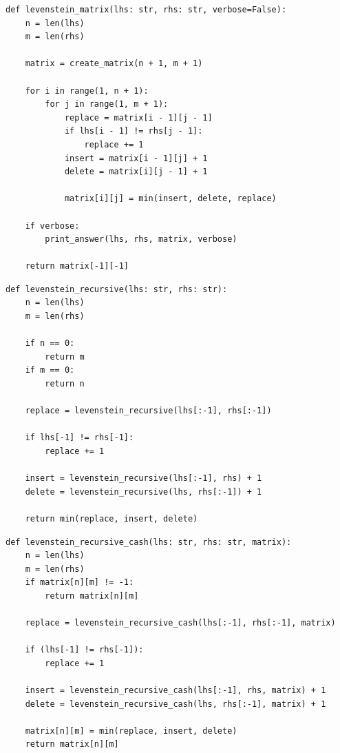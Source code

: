 \documentclass[a4paper, 12pt]{extreport}
\begin{document}
\clearpage

\begin{center}
\captionsetup{justification=raggedright,singlelinecheck=off}
\begin{lstlisting}[label=lst:levenstein_matrix,caption=Реализация матричного нахождения расстояния Левенштейна]
def levenstein_matrix(lhs: str, rhs: str, verbose=False):
    n = len(lhs)
    m = len(rhs)

    matrix = create_matrix(n + 1, m + 1)

    for i in range(1, n + 1):
        for j in range(1, m + 1):
            replace = matrix[i - 1][j - 1]
            if lhs[i - 1] != rhs[j - 1]:
                replace += 1
            insert = matrix[i - 1][j] + 1
            delete = matrix[i][j - 1] + 1
        
            matrix[i][j] = min(insert, delete, replace)

    if verbose:
        print_answer(lhs, rhs, matrix, verbose)  

    return matrix[-1][-1]
\end{lstlisting}
\end{center}


\begin{center}
\captionsetup{justification=raggedright,singlelinecheck=off}
\begin{lstlisting}[label=lst:levenstein_recursive,caption=Реализация рекурсивного нахождения расстояния Левенштейна]
def levenstein_recursive(lhs: str, rhs: str):
    n = len(lhs)
    m = len(rhs)

    if n == 0:
        return m
    if m == 0:
        return n

    replace = levenstein_recursive(lhs[:-1], rhs[:-1])
    
    if lhs[-1] != rhs[-1]:
        replace += 1

    insert = levenstein_recursive(lhs[:-1], rhs) + 1
    delete = levenstein_recursive(lhs, rhs[:-1]) + 1

    return min(replace, insert, delete)
\end{lstlisting}
\end{center}

\clearpage

\begin{center}
\captionsetup{justification=raggedright,singlelinecheck=off}
\begin{lstlisting}[label=lst:levenstein_recursive_cash,caption=Реализация рекурсивного нахождения расстояния Левенштейна с кэшированием]
def levenstein_recursive_cash(lhs: str, rhs: str, matrix):
    n = len(lhs)
    m = len(rhs)
    if matrix[n][m] != -1:
        return matrix[n][m]
    
    replace = levenstein_recursive_cash(lhs[:-1], rhs[:-1], matrix)
    
    if (lhs[-1] != rhs[-1]):
        replace += 1

    insert = levenstein_recursive_cash(lhs[:-1], rhs, matrix) + 1
    delete = levenstein_recursive_cash(lhs, rhs[:-1], matrix) + 1

    matrix[n][m] = min(replace, insert, delete)
    return matrix[n][m] 
\end{lstlisting}
\end{center}
\end{document}
